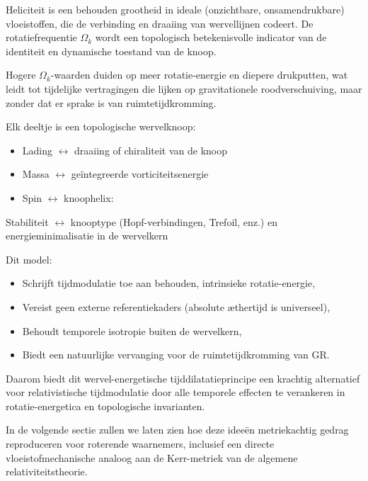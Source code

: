 Heliciteit is een behouden grootheid in ideale (onzichtbare, onsamendrukbare) vloeistoffen, die de verbinding en draaiing van wervellijnen codeert. De rotatiefrequentie $\Omega_k$ wordt een topologisch betekenisvolle indicator van de identiteit en dynamische toestand van de knoop.

Hogere $\Omega_k$-waarden duiden op meer rotatie-energie en diepere drukputten, wat leidt tot tijdelijke vertragingen die lijken op gravitationele roodverschuiving, maar zonder dat er sprake is van ruimtetijdkromming.

Elk deeltje is een topologische wervelknoop:
\begin{itemize}
\item Lading $\leftrightarrow$ draaiing of chiraliteit van de knoop
\item Massa $\leftrightarrow$ geïntegreerde vorticiteitsenergie
\item Spin $\leftrightarrow$ knoophelix:
\end{itemize}
Stabiliteit $\leftrightarrow$ knooptype (Hopf-verbindingen, Trefoil, enz.) en energieminimalisatie in de wervelkern

Dit model:

\begin{itemize}
\item Schrijft tijdmodulatie toe aan behouden, intrinsieke rotatie-energie,
\item Vereist geen externe referentiekaders (absolute æthertijd is universeel),
\item Behoudt temporele isotropie buiten de wervelkern,
\item Biedt een natuurlijke vervanging voor de ruimtetijdkromming van GR. \end{itemize}

Daarom biedt dit wervel-energetische tijddilatatieprincipe een krachtig alternatief voor relativistische tijdmodulatie door alle temporele effecten te verankeren in rotatie-energetica en topologische invarianten.

In de volgende sectie zullen we laten zien hoe deze ideeën metriekachtig gedrag reproduceren voor roterende waarnemers, inclusief een directe vloeistofmechanische analoog aan de Kerr-metriek van de algemene relativiteitstheorie.